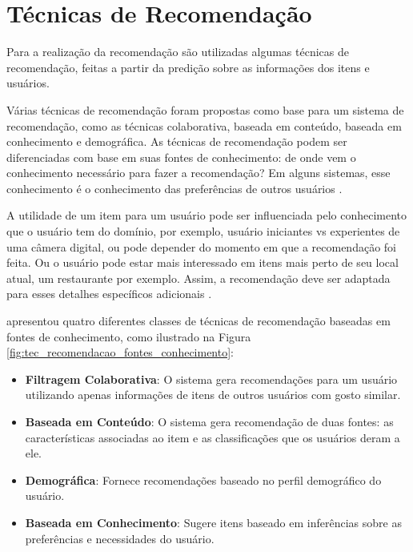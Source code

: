 \section{Técnicas de Recomendação}
\label{sec:tecnicnasRecomendacao}

Para a realização da recomendação são utilizadas algumas técnicas de recomendação, feitas a partir da predição sobre as informações dos itens e usuários.

Várias técnicas de recomendação foram propostas como base para um sistema de recomendação, como as técnicas colaborativa, baseada em conteúdo, baseada em conhecimento e demográfica. As técnicas de recomendação podem ser diferenciadas com base em suas fontes de conhecimento: de onde vem o conhecimento necessário para fazer a recomendação? Em alguns sistemas, esse conhecimento é o conhecimento das preferências de outros usuários \citep{Burke:2007:HWR:1768197.1768211}.

A utilidade de um item para um usuário pode ser influenciada pelo conhecimento que o usuário tem do domínio, por exemplo, usuário iniciantes vs experientes de uma câmera digital, ou pode depender do momento em que a recomendação foi feita. Ou o usuário pode estar mais interessado em itens mais perto de seu local atual, um restaurante por exemplo. Assim, a recomendação deve ser adaptada para esses detalhes específicos adicionais \citep{ricci2011recommender}.

\cite{Burke:2007:HWR:1768197.1768211} apresentou quatro diferentes classes de técnicas de recomendação baseadas em fontes de conhecimento, como ilustrado na Figura \ref{fig:tec_recomendacao_fontes_conhecimento}:

\begin{itemize}
	\item{\textbf{Filtragem Colaborativa}: O sistema gera recomendações para um usuário utilizando apenas informações de itens de outros usuários com gosto similar.}
	
	\item{\textbf{Baseada em Conteúdo}: O sistema gera recomendação de duas fontes: as características associadas ao item e as classificações que os usuários deram a ele.}
	
	\item{\textbf{Demográfica}: Fornece recomendações baseado no perfil demográfico do usuário.}
	
	\item{\textbf{Baseada em Conhecimento}: Sugere itens baseado em inferências sobre as preferências e necessidades do usuário.}
\end{itemize}

